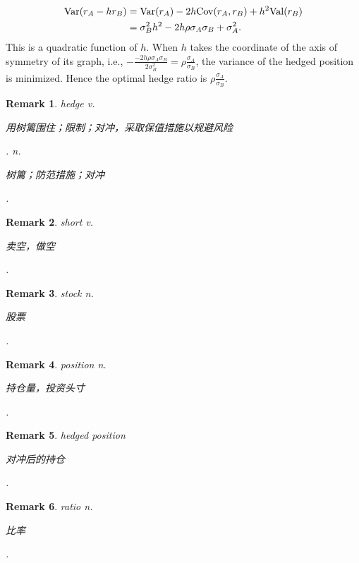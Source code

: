 \documentclass[12pt,letterpaper, onecolumn]{exam}
\newtheorem{remark}{Remark}
\begin{document}
\begin{questions}
\begin{solution}
            \begin{align*}
                {\rm{Var}}(r_A-hr_B)&={\rm{Var}}(r_A)-2h{\rm{Cov}}(r_A,r_B)+h^2{\rm{Val}}(r_B)\\
                &=\sigma_B^2h^2-2h\rho\sigma_A\sigma_B+\sigma_A^2.
            \end{align*}
            This is a quadratic function of $h$. When $h$ takes the coordinate of the axis of symmetry of its graph, i.e., $-\frac{-2h\rho\sigma_A\sigma_B}{2\sigma_B^2}=\rho\frac{\sigma_A}{\sigma_B}$, the variance of the hedged position is minimized. Hence the optimal hedge ratio is $\rho\frac{\sigma_A}{\sigma_B}$.
        \end{solution}
        \begin{remark}
            hedge  v. \begin{CJK}{UTF8}{gbsn}用树篱围住；限制；对冲，采取保值措施以规避风险\end{CJK}. n. \begin{CJK}{UTF8}{gbsn}树篱；防范措施；对冲\end{CJK}.
        \end{remark}
        \begin{remark}
            short v. \begin{CJK}{UTF8}{gbsn}卖空，做空\end{CJK}.
        \end{remark}
        \begin{remark}
            stock  n. \begin{CJK}{UTF8}{gbsn}股票\end{CJK}.
        \end{remark}
        \begin{remark}
            position n. \begin{CJK}{UTF8}{gbsn}持仓量，投资头寸\end{CJK}.
        \end{remark}
        \begin{remark}
            hedged position \begin{CJK}{UTF8}{gbsn}对冲后的持仓\end{CJK}.
        \end{remark}
        \begin{remark}
            ratio  n. \begin{CJK}{UTF8}{gbsn}比率\end{CJK}.
        \end{remark}


\end{questions}
\end{document}

